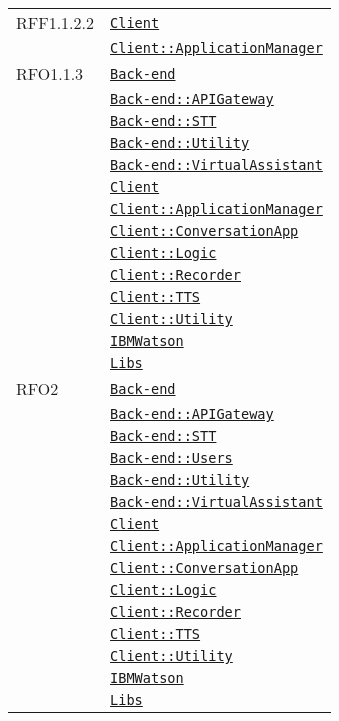 \begin{longtable}{|>{\centering}m{3cm}|m{10cm}<{\centering}|}
RFF1.1.2.2 & \hyperref[Client]{\texttt{Client}}\\
& \hyperref[Client::ApplicationManager]{\texttt{Client::ApplicationManager}}\\ \hline

RFO1.1.3 & \hyperref[Back-end]{\texttt{Back-end}}\\
& \hyperref[Back-end::APIGateway]{\texttt{Back-end::APIGateway}}\\
& \hyperref[Back-end::STT]{\texttt{Back-end::STT}}\\
& \hyperref[Back-end::Utility]{\texttt{Back-end::Utility}}\\
& \hyperref[Back-end::VirtualAssistant]{\texttt{Back-end::VirtualAssistant}}\\
& \hyperref[Client]{\texttt{Client}}\\
& \hyperref[Client::ApplicationManager]{\texttt{Client::ApplicationManager}}\\
& \hyperref[Client::ConversationApp]{\texttt{Client::ConversationApp}}\\
& \hyperref[Client::Logic]{\texttt{Client::Logic}}\\
& \hyperref[Client::Recorder]{\texttt{Client::Recorder}}\\
& \hyperref[Client::TTS]{\texttt{Client::TTS}}\\
& \hyperref[Client::Utility]{\texttt{Client::Utility}}\\
& \hyperref[IBMWatson]{\texttt{IBMWatson}}\\
& \hyperref[Libs]{\texttt{Libs}}\\ \hline

RFO2 & \hyperref[Back-end]{\texttt{Back-end}}\\
& \hyperref[Back-end::APIGateway]{\texttt{Back-end::APIGateway}}\\
& \hyperref[Back-end::STT]{\texttt{Back-end::STT}}\\
& \hyperref[Back-end::Users]{\texttt{Back-end::Users}}\\
& \hyperref[Back-end::Utility]{\texttt{Back-end::Utility}}\\
& \hyperref[Back-end::VirtualAssistant]{\texttt{Back-end::VirtualAssistant}}\\
& \hyperref[Client]{\texttt{Client}}\\
& \hyperref[Client::ApplicationManager]{\texttt{Client::ApplicationManager}}\\
& \hyperref[Client::ConversationApp]{\texttt{Client::ConversationApp}}\\
& \hyperref[Client::Logic]{\texttt{Client::Logic}}\\
& \hyperref[Client::Recorder]{\texttt{Client::Recorder}}\\
& \hyperref[Client::TTS]{\texttt{Client::TTS}}\\
& \hyperref[Client::Utility]{\texttt{Client::Utility}}\\
& \hyperref[IBMWatson]{\texttt{IBMWatson}}\\
& \hyperref[Libs]{\texttt{Libs}}\\ \hline


\end{longtable}
